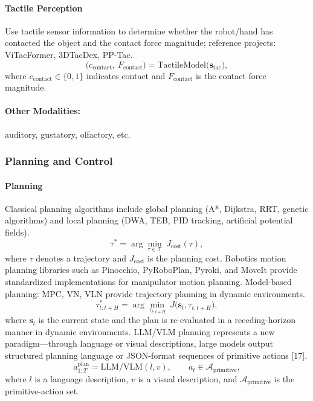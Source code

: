 \documentclass[12pt,a4paper]{article}
\begin{document}
\paragraph{Tactile Perception}
Use tactile sensor information to determine whether the robot/hand has contacted the object and the contact force magnitude; reference projects: ViTacFormer, 3DTacDex, PP-Tac.
\begin{equation}
\bigl(c_{\mathrm{contact}},\ F_{\mathrm{contact}}\bigr)=\mathrm{TactileModel}\bigl(\mathbf{s}_{\mathrm{tac}}\bigr),
\label{eq:tactile}
\end{equation}
where $c_{\mathrm{contact}}\in\{0,1\}$ indicates contact and $F_{\mathrm{contact}}$ is the contact force magnitude.

\paragraph{Other Modalities:} auditory, gustatory, olfactory, etc.

\subsubsection{Planning and Control}
\paragraph{Planning}
Classical planning algorithms include global planning (A*, Dijkstra, RRT, genetic algorithms) and local planning (DWA, TEB, PID tracking, artificial potential fields).
\begin{equation}
\tau^{*}=\arg\min_{\tau\in\mathcal{T}}\ J_{\mathrm{cost}}(\tau),
\label{eq:planning-cost}
\end{equation}
where $\tau$ denotes a trajectory and $J_{\mathrm{cost}}$ is the planning cost.
Robotics motion planning libraries such as Pinocchio, PyRoboPlan, Pyroki, and MoveIt provide standardized implementations for manipulator motion planning.
Model-based planning: MPC, VN, VLN provide trajectory planning in dynamic environments.
\begin{equation}
\tau_{t:t+H}^{*}=\arg\min_{\tau_{t:t+H}}\ J\bigl(\mathbf{s}_t,\tau_{t:t+H}\bigr),
\label{eq:model-planning}
\end{equation}
where $\mathbf{s}_t$ is the current state and the plan is re-evaluated in a receding-horizon manner in dynamic environments.
LLM/VLM planning represents a new paradigm---through language or visual descriptions, large models output structured planning language or JSON-format sequences of primitive actions [17].
\begin{equation}
a_{1:T}^{\mathrm{plan}}=\mathrm{LLM/VLM}(l,v),\qquad
a_t\in\mathcal{A}_{\mathrm{primitive}},
\label{eq:llm-planning}
\end{equation}
where $l$ is a language description, $v$ is a visual description, and $\mathcal{A}_{\mathrm{primitive}}$ is the primitive-action set.
\end{document}
